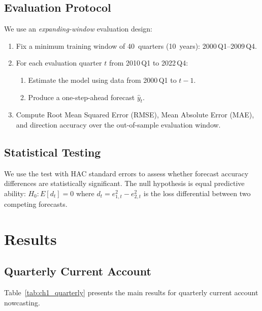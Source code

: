 \subsection{Evaluation Protocol}

We use an \emph{expanding-window} evaluation design:
\begin{enumerate}
  \item Fix a minimum training window of 40~quarters (10~years): 2000\,Q1--2009\,Q4.
  \item For each evaluation quarter $t$ from 2010\,Q1 to 2022\,Q4:
    \begin{enumerate}
      \item Estimate the model using data from 2000\,Q1 to $t-1$.
      \item Produce a one-step-ahead forecast $\hat{y}_t$.
    \end{enumerate}
  \item Compute Root Mean Squared Error (RMSE), Mean Absolute Error (MAE), and direction accuracy over the out-of-sample evaluation window.
\end{enumerate}

\subsection{Statistical Testing}

We use the \citet{diebold1995comparing} test with \citet{newey1987simple} HAC standard errors to assess whether forecast accuracy differences are statistically significant.  The null hypothesis is equal predictive ability: $H_0: E[d_t] = 0$ where $d_t = e_{1,t}^2 - e_{2,t}^2$ is the loss differential between two competing forecasts.


\section{Results}
\label{sec:ch1_results}

\subsection{Quarterly Current Account}

Table~\ref{tab:ch1_quarterly} presents the main results for quarterly current account nowcasting.


